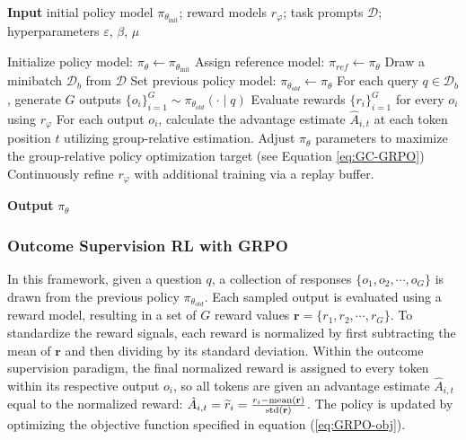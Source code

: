 \begin{itemize}[topsep=0pt]
\begin{itemize}[topsep=0pt]
\begin{algorithm}[t]
  \small
  \caption{Iterative Group Relative Policy Optimization}
  \textbf{Input} initial policy model $\pi_{\theta_{\text{init}}}$; reward models $r_\varphi$; task prompts $\mathcal{D}$; 
  hyperparameters $\varepsilon$, $\beta$, $\mu$
  \begin{algorithmic}[1]
    \State Initialize policy model: $\pi_\theta \gets \pi_{\theta_{\text{init}}}$
       \State Assign reference model: $\pi_{ref} \gets \pi_\theta$
      \State Draw a minibatch $\mathcal{D}_b$ from $\mathcal{D}$
      \State Set previous policy model: $\pi_{\theta_{old}} \gets \pi_{\theta}$
      \State For each query $q \in \mathcal{D}_b$, generate $G$ outputs $\{o_i\}_{i=1}^G \sim \pi_{\theta_{old}} (\cdot \mid q) $
      \State Evaluate rewards $\{r_i\}_{i=1}^{G}$ for every $o_i$ using $r_{\varphi}$ 
      \State For each output $o_i$, calculate the advantage estimate $\hat{A}_{i,t}$ at each token position $t$ utilizing group-relative estimation.
        \State Adjust $\pi_\theta$ parameters to maximize the group-relative policy optimization target (see Equation \ref{eq:GC-GRPO})
      \EndFor
    \EndFor
    \State Continuously refine $r_\varphi$ with additional training via a replay buffer.
    \EndFor
  \end{algorithmic}
  \textbf{Output} $\pi_\theta$
  \label{alg:iter-grpo}
\end{algorithm}

\subsubsection{Outcome Supervision RL with GRPO} In this framework, given a question $q$, a collection of responses $\{o_1, o_2, \cdots, o_G\}$ is drawn from the previous policy $\pi_{\theta_{old}}$. Each sampled output is evaluated using a reward model, resulting in a set of $G$ reward values $\mathbf{r}=\{r_1, r_2, \cdots, r_G\}$. To standardize the reward signals, each reward is normalized by first subtracting the mean of $\mathbf{r}$ and then dividing by its standard deviation. Within the outcome supervision paradigm, the final normalized reward is assigned to every token within its respective output $o_i$, so all tokens are given an advantage estimate $\hat{A}_{i, t}$ equal to the normalized reward: $\hat{A}_{i, t} = \widetilde{r}_i = \frac{r_i- {\rm mean}(\mathbf{r})}{{\rm std}(\mathbf{r})}$. The policy is updated by optimizing the objective function specified in equation (\ref{eq:GRPO-obj}).


\end{itemize}
\end{itemize}
